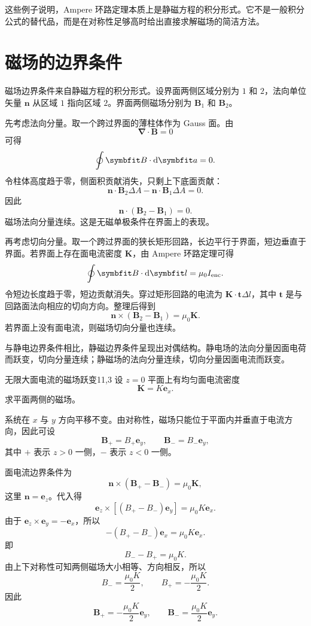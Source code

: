 这些例子说明，Ampere 环路定理本质上是静磁方程的积分形式。它不是一般积分公式的替代品，而是在对称性足够高时给出直接求解磁场的简洁方法。

\section{磁场的边界条件}

磁场边界条件来自静磁方程的积分形式。设界面两侧区域分别为 $1$ 和 $2$，法向单位矢量 $\bm{n}$ 从区域 $1$ 指向区域 $2$。界面两侧磁场分别为 $\bm{B}_{1}$ 和 $\bm{B}_{2}$。

先考虑法向分量。取一个跨过界面的薄柱体作为 Gauss 面。由
\[
\bm{\nabla}\cdot\bm{B}=0
\]
可得
\[
\oint \bm{B}\cdot\dif\bm{a}=0.
\]
令柱体高度趋于零，侧面积贡献消失，只剩上下底面贡献：
\[
\bm{n}\cdot\bm{B}_{2}\Delta A
-
\bm{n}\cdot\bm{B}_{1}\Delta A=0.
\]
因此
\begin{equation}
	\bm{n}\cdot(\bm{B}_{2}-\bm{B}_{1})=0.
	\label{eq:11:boundary-normal-b}
\end{equation}
磁场法向分量连续。这是无磁单极条件在界面上的表现。

再考虑切向分量。取一个跨过界面的狭长矩形回路，长边平行于界面，短边垂直于界面。若界面上存在面电流密度 $\bm{K}$，由 Ampere 环路定理可得
\[
\oint \bm{B}\cdot\dif\bm{l}
=
\mu_{0}I_{\mathrm{enc}}.
\]
令短边长度趋于零，短边贡献消失。穿过矩形回路的电流为 $\bm{K}\cdot\bm{t}\Delta l$，其中 $\bm{t}$ 是与回路面法向相应的切向方向。整理后得到
\begin{equation}
	\bm{n}\times(\bm{B}_{2}-\bm{B}_{1})
	=
	\mu_{0}\bm{K}.
	\label{eq:11:boundary-tangential-b}
\end{equation}
若界面上没有面电流，则磁场切向分量也连续。

与静电边界条件相比，静磁边界条件呈现出对偶结构。静电场的法向分量因面电荷而跃变，切向分量连续；静磁场的法向分量连续，切向分量因面电流而跃变。

\begin{example}{无限大面电流的磁场跃变}{11,3}
	设 $z=0$ 平面上有均匀面电流密度
	\[
	\bm{K}=K\bm{e}_{x}.
	\]
	求平面两侧的磁场。
	
	\begin{solution}
		系统在 $x$ 与 $y$ 方向平移不变。由对称性，磁场只能位于平面内并垂直于电流方向，因此可设
		\[
		\bm{B}_{+}=B_{+}\bm{e}_{y},
		\qquad
		\bm{B}_{-}=B_{-}\bm{e}_{y},
		\]
		其中 $+$ 表示 $z>0$ 一侧，$-$ 表示 $z<0$ 一侧。
		
		面电流边界条件为
		\[
		\bm{n}\times(\bm{B}_{+}-\bm{B}_{-})
		=
		\mu_{0}\bm{K},
		\]
		这里 $\bm{n}=\bm{e}_{z}$。代入得
		\[
		\bm{e}_{z}\times[(B_{+}-B_{-})\bm{e}_{y}]
		=
		\mu_{0}K\bm{e}_{x}.
		\]
		由于 $\bm{e}_{z}\times\bm{e}_{y}=-\bm{e}_{x}$，所以
		\[
		-(B_{+}-B_{-})\bm{e}_{x}
		=
		\mu_{0}K\bm{e}_{x}.
		\]
		即
		\[
		B_{-}-B_{+}=\mu_{0}K.
		\]
		由上下对称性可知两侧磁场大小相等、方向相反，所以
		\[
		B_{-}=\frac{\mu_{0}K}{2},
		\qquad
		B_{+}=-\frac{\mu_{0}K}{2}.
		\]
		因此
		\[
		\bm{B}_{+}
		=
		-\frac{\mu_{0}K}{2}\bm{e}_{y},
		\qquad
		\bm{B}_{-}
		=
		\frac{\mu_{0}K}{2}\bm{e}_{y}.
		\]
	\end{solution}
\end{example}


